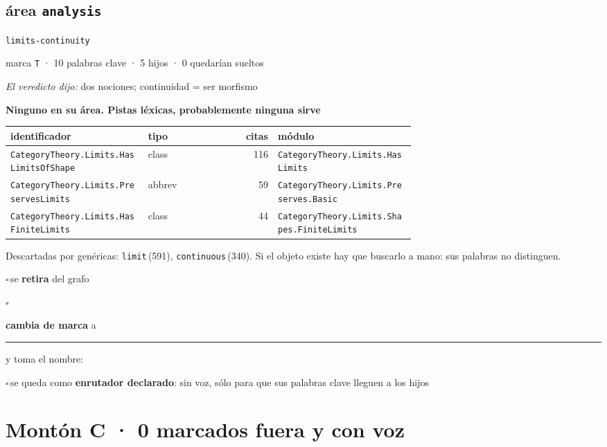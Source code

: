 \documentclass[10pt,a4paper]{article}
\begin{document}
\subsection*{área \texttt{analysis}}
\noindent\texttt{limits-\allowbreak{}continuity}\par
{\small\color{suave}marca \texttt{T} · 10 palabras clave · 5 hijos · 0 quedarían sueltos}\par\smallskip
{\small\emph{El veredicto dijo:} dos nociones; continuidad = ser morfismo}\par\smallskip
{\small\textbf{Ninguno en su área. Pistas léxicas, probablemente ninguna sirve}}\par\smallskip
\noindent\small\begin{tabular}{@{}>{\raggedright\arraybackslash}p{0.34\linewidth}l r>{\raggedright\arraybackslash}p{0.34\linewidth}@{}}\toprule
identificador & tipo & citas & módulo\\\midrule
\texttt{CategoryTheory.\allowbreak{}Limits.\allowbreak{}HasLimitsOfShape} & class & 116 & \texttt{CategoryTheory.\allowbreak{}Limits.\allowbreak{}HasLimits}\\
\texttt{CategoryTheory.\allowbreak{}Limits.\allowbreak{}PreservesLimits} & abbrev & 59 & \texttt{CategoryTheory.\allowbreak{}Limits.\allowbreak{}Preserves.\allowbreak{}Basic}\\
\texttt{CategoryTheory.\allowbreak{}Limits.\allowbreak{}HasFiniteLimits} & class & 44 & \texttt{CategoryTheory.\allowbreak{}Limits.\allowbreak{}Shapes.\allowbreak{}FiniteLimits}\\
\bottomrule\end{tabular}\par\smallskip
{\footnotesize\color{suave}Descartadas por genéricas: \texttt{limit}\,(591), \texttt{continuous}\,(340). Si el objeto existe hay que buscarlo a mano: sus palabras no distinguen.}\par\smallskip
\noindent$\square$\,{\small se \textbf{retira} del grafo}\par
\noindent$\square$\,{\small \textbf{cambia de marca} a \rule{2em}{0.4pt} y toma el nombre: \dotfill}\par
\noindent$\square$\,{\small se queda como \textbf{enrutador declarado}: sin voz, sólo para que sus palabras clave lleguen a los hijos}\par
\medskip
\newpage
\section*{Montón C · 0 marcados fuera y con voz}
\end{document}
